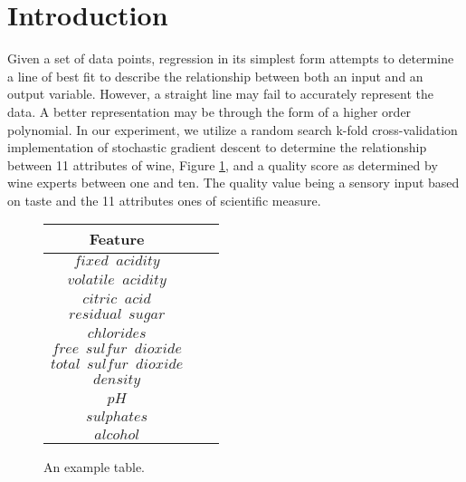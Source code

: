 
\section{Introduction}
\label{sec:intro}

Given a set of data points, regression in its simplest form attempts to 
determine a line of best fit to describe the relationship between both an
input and an output variable. However, a straight line may fail to
accurately represent the data. A better representation may be through
the form of a higher order polynomial. In our experiment, we utilize
a random search k-fold cross-validation implementation of stochastic
gradient descent to determine the relationship between 11 attributes of wine,
Figure \ref{tab:attributes}, and a quality score as determined by wine experts
between one and ten. The quality value being a sensory input based on taste
and the 11 attributes ones of scientific measure.



\begin{figure}[htb]
  \centering %

  \begin{tabular}{|c|c|c|} 
    \hline \hline %
    Feature \\ %
    \hline %
    $fixed \phantom aacidity$\\
    $volatile   \phantom  aacidity$\\
    $citric   \phantom aacid$\\
    $residual   \phantom ssugar$\\
    $chlorides$\\
    $free   \phantom ssulfur \phantom ddioxide$\\
    $total  \phantom ssulfur  \phantom ddioxide$\\
    $density$\\
    $pH$\\
    $sulphates$\\
    $alcohol$\\
    \hline \hline
  \end{tabular}

  \caption{An example table.}
  \label{tab:attributes}
\end{figure}


